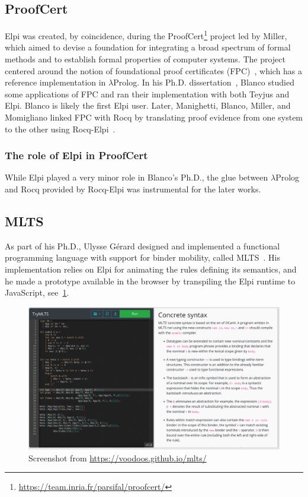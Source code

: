 \documentclass{these-ISSS}
\begin{document}
\subsection{ProofCert}

Elpi was created, by coincidence, during the
ProofCert\footnote{\url{https://team.inria.fr/parsifal/proofcert/}}
project led by Miller, which aimed to devise a foundation for integrating a
broad spectrum of formal methods and to establish formal properties of computer
systems. The project centered around the notion of foundational proof
certificates (FPC)~\cite{Marek_2016}, which has a reference implementation in
$\lambda$Prolog. In his Ph.D. dissertation~\cite{rob}, Blanco studied some
applications of FPC and ran their implementation with both Teyjus and Elpi.
Blanco is likely the first Elpi user. Later, Manighetti, Blanco, Miller, and
Momigliano linked FPC with Rocq by translating proof evidence from one system
to the other using Rocq-Elpi~\cite{matteo,alberto}.

\subsubsection{The role of Elpi in ProofCert}

While Elpi played a very minor role in Blanco's Ph.D., the glue between
$\lambda$Prolog and Rocq provided by Rocq-Elpi was instrumental for the later
works.

\subsection{MLTS}

As part of his Ph.D., Ulysse G\'{e}rard designed and implemented a
functional programming language with support for binder mobility, called MLTS~\cite{mlts}.
His implementation relies on Elpi for animating the rules defining its
semantics, and he made a prototype available in the browser by transpiling
the Elpi runtime to JavaScript, see~\cref{fig:mlts}.

\begin{figure}
    \includegraphics[width=.9\textwidth]{MLTS}
    \caption{Screenshot from \url{https://voodoos.github.io/mlts/}\label{fig:mlts}}
\end{figure}
\end{document}
